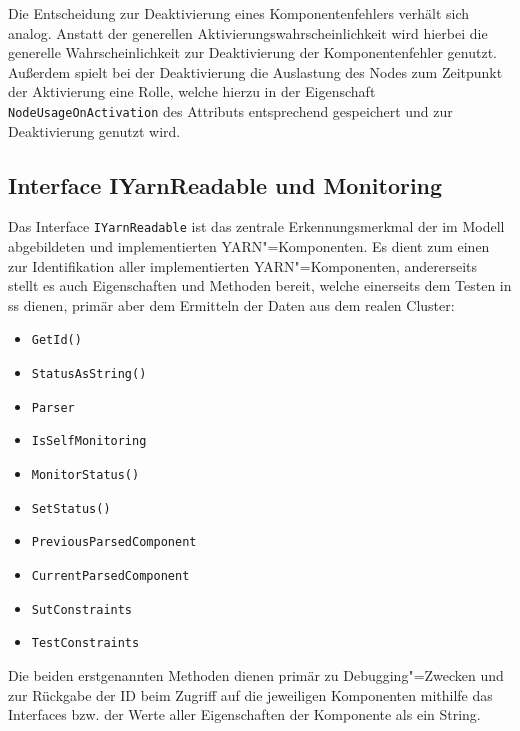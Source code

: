 Die Entscheidung zur Deaktivierung eines Komponentenfehlers verhält sich analog.
Anstatt der generellen Aktivierungswahrscheinlichkeit wird hierbei die generelle Wahrscheinlichkeit zur Deaktivierung der Komponentenfehler genutzt.
Außerdem spielt bei der Deaktivierung die Auslastung des Nodes zum Zeitpunkt der Aktivierung eine Rolle, welche hierzu in der Eigenschaft \texttt{NodeUsageOnActivation} des Attributs entsprechend gespeichert und zur Deaktivierung genutzt wird.

\subsection{Interface IYarnReadable und Monitoring}
\label{subsec:yarnComponentInterface}

Das Interface \texttt{IYarnReadable} ist das zentrale Erkennungsmerkmal der im Modell abgebildeten und implementierten \gls{YARN}"=Komponenten.
Es dient zum einen zur Identifikation aller implementierten \gls{YARN}"=Komponenten, andererseits stellt es auch Eigenschaften und Methoden bereit, welche einerseits dem Testen in \gls{ss} dienen, primär aber dem Ermitteln der Daten aus dem realen Cluster:

\begin{itemize}
    \item \texttt{GetId()}
    \item \texttt{StatusAsString()}
    
    \item \texttt{Parser}
    \item \texttt{IsSelfMonitoring}
    \item \texttt{MonitorStatus()}
    \item \texttt{SetStatus()}
    
    \item \texttt{PreviousParsedComponent}
    \item \texttt{CurrentParsedComponent}
    \item \texttt{SutConstraints}
    \item \texttt{TestConstraints}
\end{itemize}

Die beiden erstgenannten Methoden dienen primär zu Debugging"=Zwecken und zur Rückgabe der ID beim Zugriff auf die jeweiligen Komponenten mithilfe das Interfaces bzw. der Werte aller Eigenschaften der Komponente als ein String.

